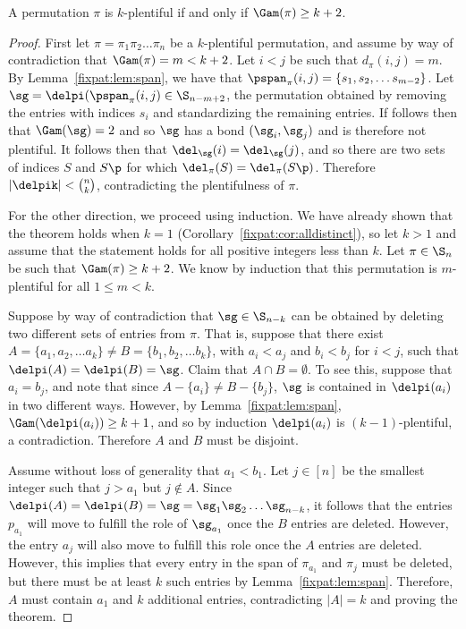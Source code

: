 \documentclass[12pt,twoside]{memoir}
\begin{document}
    \begin{theorem} \label{fixpat:thm:kplentiful}
      A permutation $\pi$ is $k$-plentiful if and only if $\Gam(\pi) \geq k+2$. 
    \end{theorem}
    \begin{proof}
      First let $\pi = \pi_1 \pi_2 \dots \pi_n$ be a $k$-plentiful permutation, and
      assume by way of contradiction that $\Gam(\pi) = m < k+2$. Let $i<j$ be
      such that $d_\pi(i,j) = m$. By Lemma~\ref{fixpat:lem:span}, we have that
      $\pspan_\pi(i,j) = \{s_1, s_2, \dots s_{m-2}\}$. Let $\sg =
      \delpi(\pspan_\pi(i,j) \in \S_{n-m+2}$, the permutation obtained by
      removing the entries with indices $s_i$ and standardizing the remaining
      entries. If follows then that $\Gam(\sg) = 2$ and so $\sg$ has a bond
      $(\sg_i, \sg_j)$ and is therefore not plentiful. It follows then that
      $\del_\sg(i) = \del_\sg(j)$, and so there are two sets of indices $S$ and
      $S\p$ for which $\del_\pi(S) = \del_\pi(S\p)$. Therefore $|\delpik| <
      \binom{n}{k}$, contradicting the plentifulness of $\pi$. 

      For the other direction, we proceed using induction.
      We have already shown that the theorem holds when $k=1$
      (Corollary~\ref{fixpat:cor:alldistinct}), so let $k>1$ and assume that the
      statement holds for all positive integers less than $k$.
      Let $\pi \in \S_n$ be such that $\Gam(\pi) \geq k+2$. We know by induction
      that this permutation is $m$-plentiful for all $1 \leq m < k$. 

      Suppose by way of contradiction that $\sg \in \S_{n - k}$ can be obtained
      by deleting two different sets of entries from $\pi$. That is, suppose that
      there exist $A = \{a_1, a_2, \dots a_k\} \neq B = \{b_1, b_2, \dots
      b_k\}$, with $a_i < a_j$ and $b_i < b_j$ for $i < j$, such that $\delpi(A)
      = \delpi(B) = \sg$. Claim that $A \cap B = \emptyset$. To see this, suppose
      that $a_i = b_j$, and note that since $A - \{a_i\} \neq B - \{b_j\}$, 
      $\sg$ is contained in $\delpi(a_i)$ in two different ways. However, by
      Lemma~\ref{fixpat:lem:span}, $\Gam(\delpi(a_i)) \geq k + 1$, and so by
      induction $\delpi(a_i)$ is $(k-1)$-plentiful, a contradiction. Therefore $A$ and
      $B$ must be disjoint. 

      Assume without loss of generality that $a_1 < b_1$. Let $j \in [n]$ be the
      smallest integer such that $j > a_1$ but $j \notin A$. Since $\delpi(A) =
      \delpi(B) = \sg = \sg_1 \sg_2 \dots \sg_{n-k}$, it follows that the
      entries $p_{a_1}$ will move to fulfill the role of $\sg_{a_1}$ once the $B$
      entries are deleted. However, the entry $a_j$ will also move to fulfill
      this role once the $A$ entries are deleted. However, this implies that
      every entry in the span of $\pi_{a_1}$ and $\pi_{j}$ must be deleted, but
      there must be at least $k$ such entries by Lemma~\ref{fixpat:lem:span}.
      Therefore, $A$ must contain $a_1$ and $k$ additional entries, contradicting
      $|A| = k$ and proving the theorem. 
    \end{proof}
\end{document}
